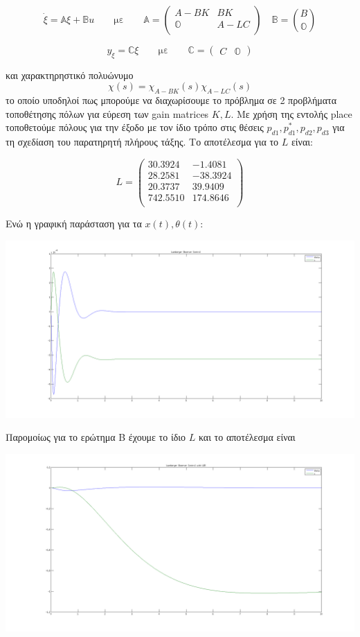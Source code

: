 \documentclass[a4paper,oneside, 12pt]{article}
\begin{document}
$$\dot \xi = \mathbb A \xi + \mathbb B u \qquad \text{με} \qquad \mathbb A = \begin{pmatrix}
A - BK & BK \\ \mathbb O & A - LC \\ 
\end{pmatrix}
\quad \mathbb B = \binom B {\mathbb O}$$

$$y_\xi = \mathbb C \xi  \qquad \text{με} \qquad \mathbb C = \begin{pmatrix}
C & \mathbb O
\end{pmatrix}$$

και χαρακτηρηστικό πολυώνυμο $$\chi (s) = \chi_{A-BK} (s) \chi_{A - LC} (s)$$ το οποίο υποδηλοί πως μπορούμε να διαχωρίσουμε το πρόβλημα σε 2 προβλήματα τοποθέτησης πόλων για εύρεση των gain matrices $K, L$. Με χρήση της εντολής place τοποθετούμε πόλους για την έξοδο με τον ίδιο τρόπο στις θέσεις $p_{d1}, p_{d1}^*, p_{d2}, p_{d3}$ για τη σχεδίαση του παρατηρητή πλήρους τάξης. Το αποτέλεσμα για το $L$ είναι: 

$$ L = \begin{pmatrix}
  30.3924  & -1.4081 \\ 
   28.2581 & -38.3924 \\ 
   20.3737 &  39.9409 \\
  742.5510 & 174.8646 \\
\end{pmatrix}$$

Ενώ η γραφική παράσταση για τα $x(t), \theta(t)$: 

\includegraphics[width=\textwidth]{D.png}

Παρομοίως για το ερώτημα B έχουμε το ίδιο $L$ και το αποτέλεσμα είναι

\includegraphics[width=\textwidth]{D1.png}
\end{document}
